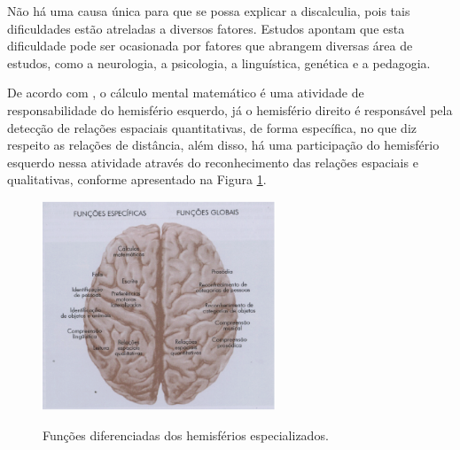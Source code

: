 \documentclass[
	12pt,				%
    oneside,			%
	a4paper,			%
	english,			%
	french,				%
	spanish,			%
	brazil,				%
	]{abntex2}
\begin{document}
Não há uma causa única para que se possa explicar a discalculia, pois tais dificuldades estão atreladas a diversos fatores. Estudos apontam que esta dificuldade pode ser ocasionada por fatores que abrangem diversas área de estudos, como a neurologia, a psicologia, a linguística, genética e a pedagogia.

De acordo com , o cálculo mental matemático é uma atividade de responsabilidade do hemisfério esquerdo, já o hemisfério direito é responsável pela detecção de relações espaciais quantitativas, de forma específica, no que diz respeito as relações de distância, além disso, há uma participação do hemisfério esquerdo nessa atividade através do reconhecimento das relações espaciais e qualitativas, conforme apresentado na Figura \ref{cerebro}.


\begin{figure} [h] 


\caption{Funções diferenciadas dos hemisférios especializados.}

\includegraphics[width=0.62\textwidth]{cerebro.png} %
\centering
\\
\label{cerebro} 
\end{figure}
\end{document}
